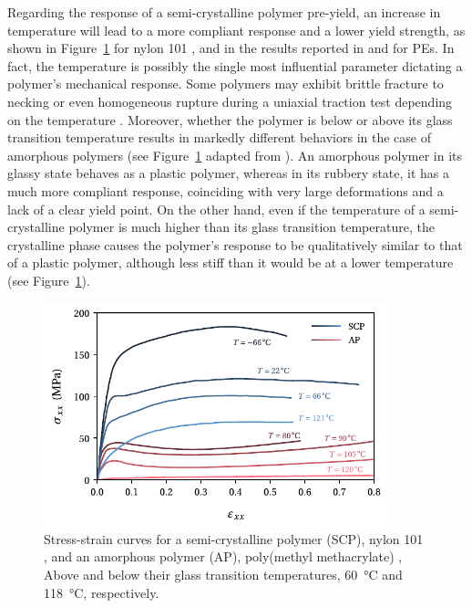 Regarding the response of a semi-crystalline polymer pre-yield, an increase in temperature will lead to a more compliant response and a lower yield strength, as shown in Figure~\ref{fig:scheme_effect_temperature} for nylon 101 \citep{khanThermomechanicalResponseNylon2006}, and in the results reported in \cite{brownInfluenceMolecularConformation2007} and \cite{hobeikaTemperatureStrainRate2000} for PEs.
In fact, the temperature is possibly the single most influential parameter dictating a polymer's mechanical response.
Some polymers may exhibit brittle fracture to necking or even homogeneous rupture during a uniaxial traction test depending on the temperature \citep{wardIntroductionMechanicalProperties2004}.
Moreover, whether the polymer is below or above its glass transition temperature results in markedly different behaviors in the case of amorphous polymers (see Figure~\ref{fig:scheme_effect_temperature} adapted from \cite{vanloockDeformationFailureMaps2018}).
An amorphous polymer in its glassy state behaves as a plastic polymer, whereas in its rubbery state, it has a much more compliant response, coinciding with very large deformations and a lack of a clear yield point.
On the other hand, even if the temperature of a semi-crystalline polymer is much higher than its glass transition temperature, the crystalline phase causes the polymer's response to be qualitatively similar to that of a plastic polymer, although less stiff than it would be at a lower temperature (see Figure~\ref{fig:scheme_effect_temperature}).
\begin{figure}[hbtp]
    \centering
    \includegraphics[width=0.9\textwidth]{figures/scheme_effect_temperature}
    \caption{Stress-strain curves for a semi-crystalline polymer (SCP), nylon 101 \citep{khanThermomechanicalResponseNylon2006}, and an amorphous polymer (AP), poly(methyl methacrylate) \citep{vanloockDeformationFailureMaps2018}, Above and below their glass transition temperatures, \SI{60}{\celsius} and \SI{118}{\celsius}, respectively.}
\label{fig:scheme_effect_temperature}
\end{figure}


